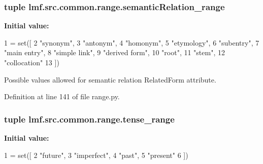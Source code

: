 \hypertarget{namespacelmf_1_1src_1_1common_1_1range_abab5b7b201360f47699b34e9e685deb6}{
\subsubsection[{semantic\+Relation\+\_\+range}]{\setlength{\rightskip}{0pt plus 5cm}tuple lmf.\+src.\+common.\+range.\+semantic\+Relation\+\_\+range}}\label{namespacelmf_1_1src_1_1common_1_1range_abab5b7b201360f47699b34e9e685deb6}
{\bfseries Initial value\+:}
\begin{DoxyCode}
1 = set([
2     \textcolor{stringliteral}{"synonym"},
3     \textcolor{stringliteral}{"antonym"},
4     \textcolor{stringliteral}{"homonym"},
5     \textcolor{stringliteral}{"etymology"},
6     \textcolor{stringliteral}{"subentry"},
7     \textcolor{stringliteral}{"main entry"},
8     \textcolor{stringliteral}{"simple link"},
9     \textcolor{stringliteral}{"derived form"},
10     \textcolor{stringliteral}{"root"},
11     \textcolor{stringliteral}{"stem"},
12     \textcolor{stringliteral}{"collocation"}
13 ])
\end{DoxyCode}


Possible values allowed for semantic relation Related\+Form attribute. 



Definition at line 141 of file range.\+py.

\hypertarget{namespacelmf_1_1src_1_1common_1_1range_acc04186fd80669c626821ad13dcb1196}{
\subsubsection[{tense\+\_\+range}]{\setlength{\rightskip}{0pt plus 5cm}tuple lmf.\+src.\+common.\+range.\+tense\+\_\+range}}\label{namespacelmf_1_1src_1_1common_1_1range_acc04186fd80669c626821ad13dcb1196}
{\bfseries Initial value\+:}
\begin{DoxyCode}
1 = set([
2     \textcolor{stringliteral}{"future"},
3     \textcolor{stringliteral}{"imperfect"},
4     \textcolor{stringliteral}{"past"},
5     \textcolor{stringliteral}{"present"}
6 ])
\end{DoxyCode}


